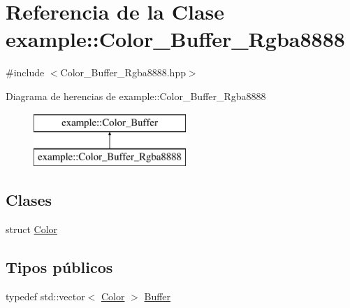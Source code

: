 \hypertarget{classexample_1_1_color___buffer___rgba8888}{}\section{Referencia de la Clase example\+::Color\+\_\+\+Buffer\+\_\+\+Rgba8888}
\label{classexample_1_1_color___buffer___rgba8888}


{\ttfamily \#include $<$Color\+\_\+\+Buffer\+\_\+\+Rgba8888.\+hpp$>$}

Diagrama de herencias de example\+::Color\+\_\+\+Buffer\+\_\+\+Rgba8888\begin{figure}[H]
\begin{center}
\leavevmode
\includegraphics[height=2.000000cm]{classexample_1_1_color___buffer___rgba8888}
\end{center}
\end{figure}
\subsection*{Clases}
\begin{DoxyCompactItemize}
\item 
struct \mbox{\hyperlink{structexample_1_1_color___buffer___rgba8888_1_1_color}{Color}}
\end{DoxyCompactItemize}
\subsection*{Tipos públicos}
\begin{DoxyCompactItemize}
\item 
typedef std\+::vector$<$ \mbox{\hyperlink{structexample_1_1_color___buffer___rgba8888_1_1_color}{Color}} $>$ \mbox{\hyperlink{classexample_1_1_color___buffer___rgba8888_ac6bfcddbbeeb02961b8724d9f5e10033}{Buffer}}
\end{DoxyCompactItemize}
